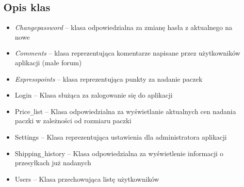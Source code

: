 \subsection{Opis klas}
\begin{itemize}
\item \textit{Change\textunderscore password} – klasa odpowiedzialna za zmianę hasła z aktualnego na nowe
\item \textit{Comments} – klasa reprezentująca komentarze napisane przez użytkowników aplikacji (małe forum)
\item \textit{Express\textunderscore points} – klasa reprezentująca punkty za nadanie paczek
\item Login – Klasa służąca za zalogowanie się do aplikacji
\item Price\verb|_|list – Klasa odpowiedzialna za wyświetlanie aktualnych cen nadania paczki w zależności od rozmiaru paczki
\item Settings – Klasa reprezentująca ustawienia dla administratora aplikacji
\item Shipping\verb|_|history – Klasa odpowiedzialna za wyświetlenie informacji o przesyłkach już nadanych
\item Users – Klasa przechowująca listę użytkowników
\end{itemize}
